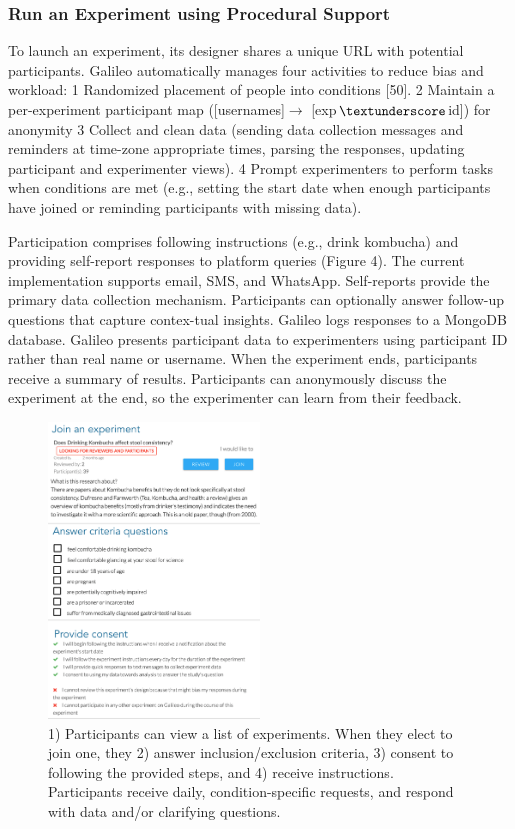 \subsubsection{Run an Experiment using Procedural Support}
To launch an experiment, its designer shares a unique URL with potential participants. Galileo automatically manages four activities to reduce bias and workload: 
1 Randomized placement of people into conditions [50].
2 Maintain a per-experiment participant map ([usernames]$\rightarrow$ [exp$\textunderscore$id]) for anonymity
3 Collect and clean data (sending data collection messages and reminders at time-zone appropriate times, parsing the responses, updating participant and experimenter views). 
4 Prompt experimenters to perform tasks when conditions are met (e.g., setting the start date when enough participants have joined or reminding participants with missing data). 

Participation comprises following instructions (e.g., drink kombucha) and providing self-report responses to platform queries (Figure 4). The current implementation supports email, SMS, and WhatsApp. Self-reports provide the primary data collection mechanism. Participants can optionally answer follow-up questions that capture contex-tual insights. Galileo logs responses to a MongoDB database. Galileo presents participant data to experimenters using participant ID rather than real name or username. When the experiment ends, participants receive a summary of results. Participants can anonymously discuss the experiment at the end, so the experimenter can learn from their feedback. 

\begin{figure}[h] 
  \centering
  \includegraphics[width=0.5\textwidth]{figures/galileo/galileo-2-run}
  \caption[]
{1) Participants can view a list of experiments. When they elect to join one, they 2) answer inclusion/exclusion criteria, 3) consent to following the provided steps, and 4) receive instructions. Participants receive daily, condition-specific requests, and respond with data and/or clarifying questions. }
  \label{fig:galileo-2-run}
\end{figure}


